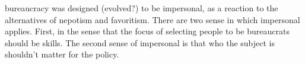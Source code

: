 bureaucracy was designed (evolved?) to be impersonal, as a reaction to the alternatives of nepotism and favoritism. There are two sense in which impersonal applies. First, in the sense that the focus of selecting people to be bureaucrats should be skills. The second sense of impersonal is that who the subject is shouldn't matter for the policy.  

